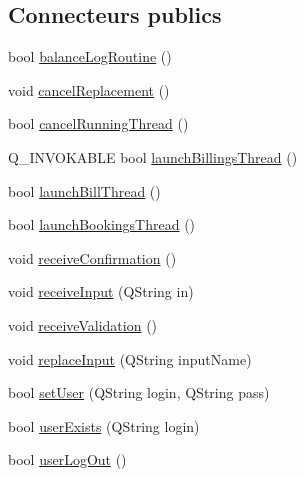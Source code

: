 \subsection*{Connecteurs publics}
\begin{DoxyCompactItemize}
\item 
bool \hyperlink{classSH__ApplicationCore_aa0cbddb57a9ade990d6ee9b4ee6c3fb3}{balance\-Log\-Routine} ()
\item 
void \hyperlink{classSH__ApplicationCore_a5b788738972737e1d9b52daeb41e8788}{cancel\-Replacement} ()
\item 
bool \hyperlink{classSH__ApplicationCore_af50ebbfed4c12ad7d69cc78f4b0d0d85}{cancel\-Running\-Thread} ()
\item 
Q\-\_\-\-I\-N\-V\-O\-K\-A\-B\-L\-E bool \hyperlink{classSH__ApplicationCore_a30738281acefd721fe9d06db46dcf123}{launch\-Billings\-Thread} ()
\item 
bool \hyperlink{classSH__ApplicationCore_a17a048025bc51a96663029e58c722741}{launch\-Bill\-Thread} ()
\item 
bool \hyperlink{classSH__ApplicationCore_a193a9132da92b5e7a450e9307b657893}{launch\-Bookings\-Thread} ()
\item 
void \hyperlink{classSH__ApplicationCore_a942eacab69b9fe54442591c07773c908}{receive\-Confirmation} ()
\item 
void \hyperlink{classSH__ApplicationCore_ae53ffaee0269f03c3c938595b9b4b39f}{receive\-Input} (Q\-String in)
\item 
void \hyperlink{classSH__ApplicationCore_af450727db378ebec9ec61457b2e13664}{receive\-Validation} ()
\item 
void \hyperlink{classSH__ApplicationCore_ae8bcd097ea219fc9a54f7d0d9ff9c335}{replace\-Input} (Q\-String input\-Name)
\item 
bool \hyperlink{classSH__ApplicationCore_a83d2df40550a95586e70a08833dc5e5f}{set\-User} (Q\-String login, Q\-String pass)
\item 
bool \hyperlink{classSH__ApplicationCore_acce6b4e70ccc2035072df11acba7065a}{user\-Exists} (Q\-String login)
\item 
bool \hyperlink{classSH__ApplicationCore_abe6683bdada7ecf979b74656748be106}{user\-Log\-Out} ()
\end{DoxyCompactItemize}
